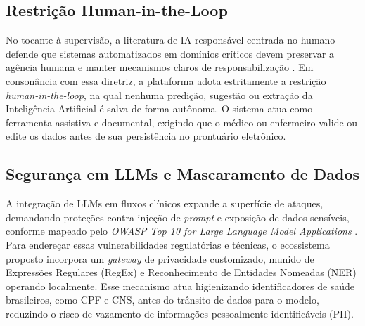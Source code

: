 \documentclass[12pt]{article}
\begin{document}
\subsection{Restrição Human-in-the-Loop}
No tocante à supervisão, a literatura de IA responsável centrada no humano defende que sistemas automatizados em domínios críticos devem preservar a agência humana e manter mecanismos claros de responsabilização \cite{Shneiderman2021}.
Em consonância com essa diretriz, a plataforma adota estritamente a restrição \textit{human-in-the-loop}, na qual nenhuma predição, sugestão ou extração da Inteligência Artificial é salva de forma autônoma.
O sistema atua como ferramenta assistiva e documental, exigindo que o médico ou enfermeiro valide ou edite os dados antes de sua persistência no prontuário eletrônico.


\subsection{Segurança em LLMs e Mascaramento de Dados}
A integração de LLMs em fluxos clínicos expande a superfície de ataques, demandando proteções contra injeção de \textit{prompt} e exposição de dados sensíveis, conforme mapeado pelo \textit{OWASP Top 10 for Large Language Model Applications} \cite{OWASPLLM2025}.
Para endereçar essas vulnerabilidades regulatórias e técnicas, o ecossistema proposto incorpora um \textit{gateway} de privacidade customizado, munido de Expressões Regulares (RegEx) e Reconhecimento de Entidades Nomeadas (NER) operando localmente.
Esse mecanismo atua higienizando identificadores de saúde brasileiros, como CPF e CNS, antes do trânsito de dados para o modelo, reduzindo o risco de vazamento de informações pessoalmente identificáveis (PII).
\end{document}
